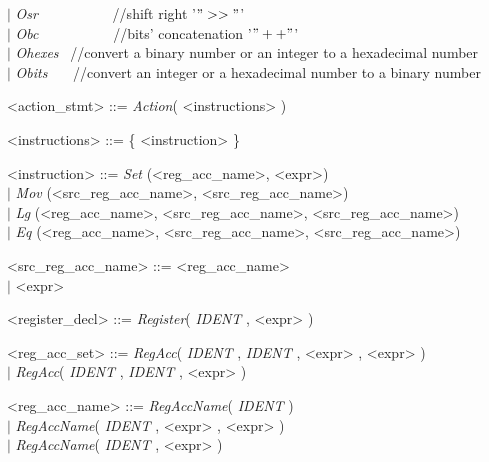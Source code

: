 \documentclass{article}
\begin{document}
\begin{grammar}
{     \hspace*{0.7cm} $\mid$  \textit{Osr} ~~~~~~~~~~//shift right '$">>"$'  \\
     \hspace*{0.7cm} $\mid$  \textit{Obc} ~~~~~~~~~~//bits' concatenation '$"++"$'  \\
     \hspace*{0.7cm} $\mid$  \textit{Ohexes} ~//convert a binary number or an integer to a hexadecimal number  \\
     \hspace*{0.7cm} $\mid$  \textit{Obits} ~~~//convert an integer or a hexadecimal number to a binary number

\par}


{\renewcommand\baselinestretch{0}\selectfont
<action\_stmt>     ::=    \textit{Action}( <instructions> )

<instructions>     ::=    \{ <instruction> \}

<instruction>     ::=   \textit{Set} (<reg\_acc\_name>, <expr>) \\
     \hspace*{1.455cm} $\mid$  \textit{Mov} (<src\_reg\_acc\_name>, <src\_reg\_acc\_name>) \\
     \hspace*{1.455cm} $\mid$  \textit{Lg} (<reg\_acc\_name>, <src\_reg\_acc\_name>, <src\_reg\_acc\_name>) \\
     \hspace*{1.455cm} $\mid$  \textit{Eq} (<reg\_acc\_name>, <src\_reg\_acc\_name>, <src\_reg\_acc\_name>)

<src\_reg\_acc\_name>   ::= <reg\_acc\_name>  \\
     \hspace*{2.6cm} $\mid$  <expr>

\par}

{\renewcommand\baselinestretch{0}\selectfont

<register\_decl>     ::=   \textit{Register}( \emph{IDENT} , <expr> )

<reg\_acc\_set>     ::=    \textit{RegAcc}( \emph{IDENT} , \emph{IDENT} , <expr> , <expr> )  \\
     \hspace*{1.66cm} $\mid$  \textit{RegAcc}( \emph{IDENT} , \emph{IDENT} , <expr> )

<reg\_acc\_name>     ::=   \textit{RegAccName}( \emph{IDENT} )   \\
     \hspace*{2cm} $\mid$ \textit{RegAccName}( \emph{IDENT} , <expr> , <expr> )    \\
     \hspace*{2cm} $\mid$ \textit{RegAccName}( \emph{IDENT} , <expr> )


\par}

\end{grammar}
\end{document}
